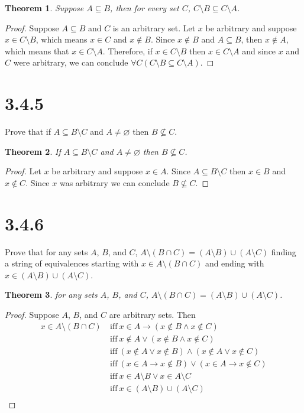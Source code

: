 \documentclass{article}
\newtheorem*{theorem}{Theorem}  %
\begin{document}
\begin{theorem} Suppose $A \subseteq B$, then for every set $C$, $C \setminus B \subseteq C \setminus A$.
\end{theorem}
\begin{proof}
Suppose $A \subseteq B$ and $C$ is an arbitrary set. Let $x$ be arbitrary and suppose $x \in C \setminus B$, which means $x \in C$ and $x \notin B$. Since $x \notin B$ and $A \subseteq B$, then $x \notin A$, which means that $x \in C \setminus A$. Therefore, if $x \in C \setminus B$ then $x \in C \setminus A$ and since $x$ and $C$ were arbitrary, we can conclude $\forall C (C \setminus B \subseteq C \setminus A).$
\end{proof}

\section*{3.4.5}
Prove that if $A \subseteq B \setminus C$ and $A \neq \varnothing$ then $B \not\subseteq C$.

\begin{theorem} If $A \subseteq B \setminus C$ and $A \neq \varnothing$ then $B \not\subseteq C$.
\end{theorem}
\begin{proof}
Let $x$ be arbitrary and suppose $x \in A$. Since $A \subseteq B \setminus C$ then $x \in B$ and $x \notin C$. Since $x$ was arbitrary we can conclude $B \not\subseteq C$.
\end{proof}

\section*{3.4.6}
Prove that for any sets $A$, $B$, and $C$, $A \setminus(B \cap C) = (A \setminus B) \cup (A \setminus C)$ finding a string of equivalences starting with $x \in A \setminus (B \cap C)$ and ending with $x \in (A \setminus B) \cup (A \setminus C)$.

\begin{theorem} for any sets $A$, $B$, and $C$, $A \setminus(B \cap C) = (A \setminus B) \cup (A \setminus C)$.
\end{theorem}
\begin{proof}
Suppose $A$, $B$, and $C$ are arbitrary sets. Then
\begin{align*}
x \in A \setminus (B \cap C) ~ &\text{iff} ~ x \in A \rightarrow (x \notin B \land x \notin C) \\
&\text{iff} ~ x \notin A \lor (x \notin B \land x \notin C) \\
&\text{iff} ~ (x \notin A \lor x \notin B) \land (x \notin A \lor x \notin C) \\
&\text{iff} ~ (x \in A \rightarrow x \notin B) \lor (x \in A \rightarrow x \notin C) \\
&\text{iff} ~ x \in A \setminus B \lor x \in A \setminus C \\
&\text{iff} ~ x \in (A \setminus B) \cup (A \setminus C) \\
\end{align*}
\end{proof}
\end{document}
